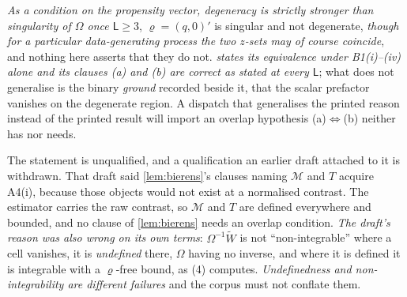 \emph{As a condition on the propensity vector, degeneracy is strictly stronger than singularity of
$\Omega$ once $\mathsf L\ge3$}, $\varrho=(q,0)'$ is singular and not degenerate, \emph{though for a
particular data-generating process the two $z$-sets may of course coincide}, and nothing here asserts
that they do not. \emph{ states its equivalence under B1(i)--(iv) alone and its
clauses (a) and (b) are
correct as stated at every $\mathsf L$}; what does not generalise is the binary \emph{ground} recorded
beside it, that the scalar prefactor vanishes on the degenerate region. A dispatch that
generalises the printed reason instead of the printed result will import an overlap hypothesis
(a)$\Leftrightarrow$(b) neither has nor needs.

The statement is unqualified, and a qualification an earlier draft attached to it is withdrawn.
That draft said \cref{lem:bierens}'s clauses naming $\mathcal M$ and $T$ acquire A4(i), because those
objects would not exist at a normalised contrast. The estimator carries the raw contrast, so
$\mathcal M$ and $T$ are defined everywhere and bounded, and no clause of \cref{lem:bierens} needs an
overlap condition. \emph{The draft's reason was also wrong on its own terms}: $\Omega^{-1}\widetilde W$
is not ``non-integrable'' where a cell vanishes, it is \emph{undefined} there, $\Omega$ having no
inverse, and where it is defined it is integrable with a $\varrho$-free bound, as
\textup{(4)} computes. \emph{Undefinedness and non-integrability are different
failures} and the corpus must not conflate them.

